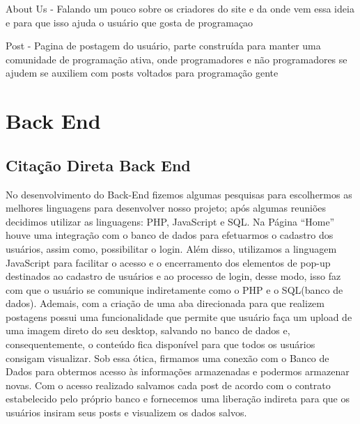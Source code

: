 About Us - Falando um pouco sobre os criadores do site e da onde vem essa ideia e para que isso ajuda  o usuário que gosta de programaçao

Post - Pagina de postagem do usuário, parte construída para manter uma comunidade de programação ativa, onde programadores e não programadores se ajudem se auxiliem com posts voltados para programação gente



\section{Back End}
\subsection{Citação Direta Back End}
\label{subsec:citacao_indireta}
No desenvolvimento do Back-End fizemos algumas pesquisas para escolhermos as melhores linguagens para  desenvolver nosso projeto; após algumas reuniões decidimos utilizar as linguagens: PHP, JavaScript e SQL. 
 Na Página “Home” houve uma integração com o banco de dados para efetuarmos o cadastro dos usuários, assim como, possibilitar o login.
Além disso, utilizamos a linguagem JavaScript para facilitar o acesso e o encerramento dos elementos de pop-up destinados ao cadastro de usuários e ao processo de login, desse modo, isso faz com que o usuário se comunique indiretamente como o PHP e o SQL(banco de dados). Ademais, com a criação de uma aba direcionada para que realizem postagens possui uma funcionalidade que permite que usuário faça um upload de uma imagem direto do seu desktop, salvando no banco de dados e, consequentemente, o conteúdo fica disponível para que todos os usuários consigam visualizar. Sob essa ótica, firmamos uma conexão com o Banco de Dados para obtermos acesso às informações armazenadas e podermos armazenar novas. Com o acesso realizado salvamos cada post de acordo com o contrato estabelecido pelo próprio banco e fornecemos uma liberação indireta para que os usuários insiram seus posts e visualizem os dados salvos.
